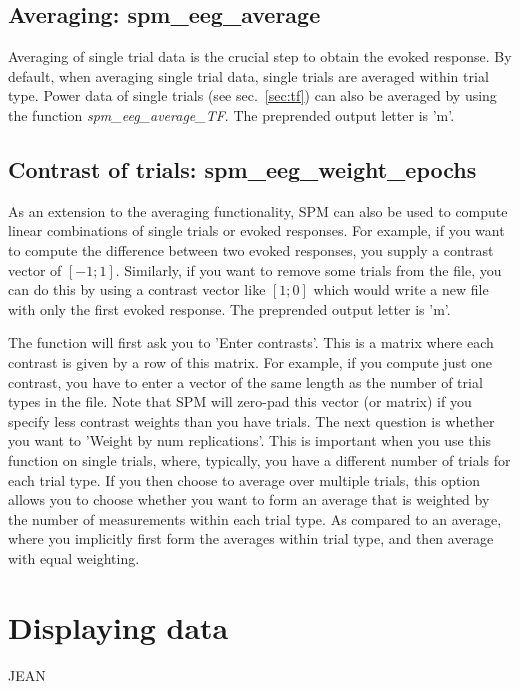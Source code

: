 \subsection{Averaging: spm\_eeg\_average}
Averaging of single trial data is the crucial step to obtain the
evoked response. By default, when averaging single trial data, single
trials are averaged within trial type. Power data of single trials
(see sec.~\ref{sec:tf}) can also be averaged by using the function
\textit{spm\_eeg\_average\_TF}. The preprended output letter is 'm'.


\subsection{Contrast of trials: spm\_eeg\_weight\_epochs}
As an extension to the averaging functionality, SPM can also be used
to compute linear combinations of single trials 
or evoked responses. For example, if you want to compute the
difference between two evoked responses, you supply a contrast vector
of $[-1; 1]$. Similarly, if you want to remove some trials from the
file, you can do this by using a contrast vector like $[1; 0]$ which
would write a new file with only the first evoked response. The
preprended output letter is 'm'. 

The function will first ask you to 'Enter contrasts'. This is a matrix where each contrast is given by a row of this matrix. For example, if you compute just one contrast, you have to enter a vector of the same length as the number of trial types in the file. Note that SPM will zero-pad this vector (or matrix) if you specify less contrast weights than you have trials. The next question is whether you want to 'Weight by num replications'. This is important when you use this function on single trials, where, typically, you have a different number of trials for each trial type. If you then choose to average over multiple trials, this option allows you to choose whether you want to form an average that is weighted by the number of measurements within each trial type. As compared to an average, where you implicitly first form the averages within trial type, and then average with equal weighting.

\section{Displaying data}
JEAN
